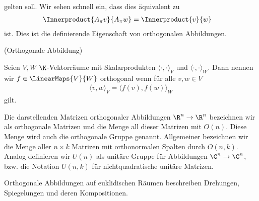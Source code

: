 \documentclass[a4paper,11pt]{article}
\begin{document}
gelten soll. Wir sehen schnell ein, dass dies äquivalent zu
\begin{align*}
    \Innerproduct{A_\pi v}{A_\pi w} & = \Innerproduct{v}{w}
\end{align*}
ist. Dies ist die definierende Eigenschaft von orthogonalen Abbildungen.
\begin{definition}{(Orthogonale Abbildung)}

    Seien $V, W$ $\K$-Vektorräume mit Skalarprodukten $\langle\cdot,\cdot\rangle_V$ und $\langle\cdot,\cdot\rangle_W$. Dann nennen wir $f \in \LinearMaps{V}{W}$ orthogonal wenn für alle $v, w \in V$
    \begin{align}
        \langle v, w\rangle_V = \langle f(v), f(w)\rangle_W
    \end{align}
    gilt.
\end{definition}
Die darstellenden Matrizen orthogonaler Abbildungen $\R^n \to \R^n$ bezeichnen wir als orthogonale Matrizen und die Menge all dieser Matrizen mit $O(n)$. Diese Menge wird auch die orthogonale Gruppe genannt. Allgemeiner bezeichnen wir die Menge aller $n \times k$ Matrizen mit orthonormalen Spalten durch $O(n,k)$. Analog definieren wir $U(n)$ als unitäre Gruppe für Abbildungen $\C^n \to \C^n$, bzw. die Notation $U(n, k)$ für nichtquadratische unitäre Matrizen.

\begin{remark}
    Orthogonale Abbildungen auf euklidischen Räumen beschreiben Drehungen, Spiegelungen und deren Kompositionen.
\end{remark}
\end{document}
